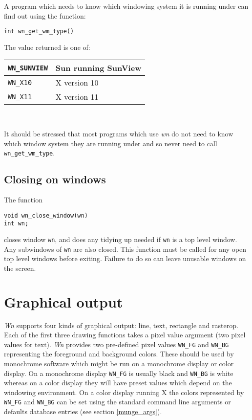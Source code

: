 A program which needs to know which windowing system it is running under can
find out using the function:
\begin{verbatim}
int wn_get_wm_type()
\end{verbatim}
The value returned is one of:
\begin{center}
\begin{tabular}{|l|p{2in}|} \hline
{\tt WN\_SUNVIEW} & Sun running SunView \\ \hline
{\tt WN\_X10} & X version 10 \\ \hline
{\tt WN\_X11} & X version 11 \\ \hline
\end{tabular}\\
\end{center}
It should be stressed that most programs which use {\em wn} do not need to
know which window system they are running under and so never need to call
{\tt wn\_get\_wm\_type}.
\subsection{Closing on windows}
The function
\begin{verbatim}
void wn_close_window(wn)
int wn;
\end{verbatim}
closes window {\tt wn}, and does any tidying up needed if {\tt wn}
is a top level window.
Any subwindows of {\tt wn} are also closed.
This function must be called for any open top level windows before exiting.
Failure to do so can leave unusable windows on the screen.
\section{Graphical output}
{\em Wn} supports four kinds of graphical output: line, text, rectangle and rasterop.
Each of the first three drawing functions takes a pixel value argument (two pixel values
for text). {\em Wn} provides two pre-defined pixel values {\tt WN\_FG} and {\tt WN\_BG}
representing the foreground and background colors.
These should be used by monochrome software which might be
run on a monochrome display or 
color display. On a monochrome display {\tt WN\_FG} is usually black and {\tt WN\_BG}
is white whereas on a color display they will have preset values which depend
on the windowing environment. On a color display
running X the colors represented by {\tt WN\_FG} and {\tt WN\_BG} can be set using
the standard command line arguments or defaults database entries
(see section \ref{munge_args}).
\pagebreak[1]
